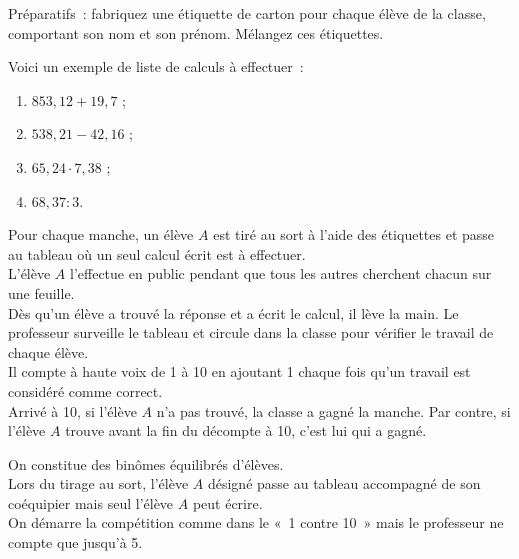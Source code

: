 
\begin{TP}
Préparatifs : fabriquez une étiquette de carton pour chaque élève de la classe, comportant son nom et son prénom. Mélangez ces étiquettes.

Voici un exemple de liste de calculs à effectuer :
\begin{enumerate}
 \item $853,12 + 19,7$ ;
 \item $538,21 - 42,16$ ;
 \item $65,24 \cdot 7,38$ ;
 \item $68,37 : 3$.
 \end{enumerate}

Pour chaque manche, un élève $A$ est tiré au sort à l'aide des étiquettes et passe au tableau où un seul calcul écrit est à effectuer. \\[0.5em]
L'élève $A$ l'effectue en public pendant que tous les autres cherchent chacun sur une feuille. \\[0.5em]
Dès qu'un élève a trouvé la réponse et a écrit le calcul, il lève la main. Le professeur surveille le tableau et circule dans la classe pour vérifier le travail de chaque élève. \\[0.5em]
Il compte à haute voix de 1 à 10 en ajoutant 1 chaque fois qu'un travail est considéré comme correct. \\[0.5em]
Arrivé à 10, si l'élève $A$ n'a pas trouvé, la classe a gagné la manche. Par contre, si l'élève $A$ trouve avant la fin du décompte à 10, c'est lui qui a gagné.

On constitue des binômes équilibrés d'élèves.\\[0.5em]
Lors du tirage au sort, l'élève $A$ désigné passe au tableau accompagné de son coéquipier mais seul l'élève $A$ peut écrire. \\[0.5em]
On démarre la compétition comme dans le « 1 contre 10 » mais le professeur ne compte que jusqu'à 5. 
\end{TP}

\newpage
